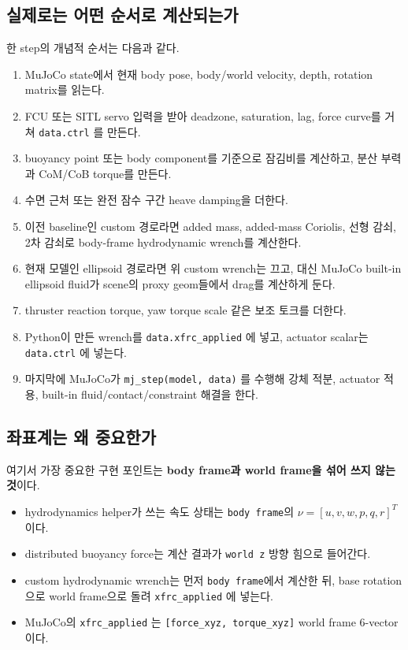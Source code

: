 \documentclass[11pt,a4paper]{article}
\newcommand{\code}[1]{\nolinkurl{#1}}
\begin{document}
\subsection{실제로는 어떤 순서로 계산되는가}

한 step의 개념적 순서는 다음과 같다.

\begin{enumerate}[leftmargin=2em]
  \item MuJoCo state에서 현재 body pose, body/world velocity, depth, rotation matrix를 읽는다.
  \item FCU 또는 SITL servo 입력을 받아 deadzone, saturation, lag, force curve를 거쳐 \code{data.ctrl} 를 만든다.
  \item buoyancy point 또는 body component를 기준으로 잠김비를 계산하고, 분산 부력과 CoM/CoB torque를 만든다.
  \item 수면 근처 또는 완전 잠수 구간 heave damping을 더한다.
  \item 이전 baseline인 custom 경로라면 added mass, added-mass Coriolis, 선형 감쇠, 2차 감쇠로 body-frame hydrodynamic wrench를 계산한다.
  \item 현재 모델인 ellipsoid 경로라면 위 custom wrench는 끄고, 대신 MuJoCo built-in ellipsoid fluid가 scene의 proxy geom들에서 drag를 계산하게 둔다.
  \item thruster reaction torque, yaw torque scale 같은 보조 토크를 더한다.
  \item Python이 만든 wrench를 \code{data.xfrc\_applied} 에 넣고, actuator scalar는 \code{data.ctrl} 에 넣는다.
  \item 마지막에 MuJoCo가 \code{mj\_step(model, data)} 를 수행해 강체 적분, actuator 적용, built-in fluid/contact/constraint 해결을 한다.
\end{enumerate}

\subsection{좌표계는 왜 중요한가}

여기서 가장 중요한 구현 포인트는 \textbf{body frame과 world frame을 섞어 쓰지 않는 것}이다.

\begin{itemize}[leftmargin=2em]
  \item hydrodynamics helper가 쓰는 속도 상태는 \code{body frame}의 $\nu=[u,v,w,p,q,r]^T$ 이다.
  \item distributed buoyancy force는 계산 결과가 \code{world z} 방향 힘으로 들어간다.
  \item custom hydrodynamic wrench는 먼저 \code{body frame}에서 계산한 뒤, base rotation으로 world frame으로 돌려 \code{xfrc\_applied} 에 넣는다.
  \item MuJoCo의 \code{xfrc\_applied} 는 \code{[force\_xyz, torque\_xyz]} world frame 6-vector 이다.
\end{itemize}
\end{document}
